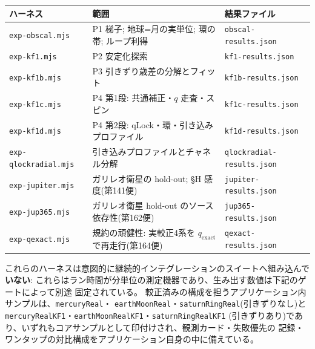 \documentclass[a4paper,10pt,twocolumn]{ltjsarticle}
\begin{document}
\begin{center}
{\footnotesize\setlength{\tabcolsep}{3pt}
\begin{tabularx}{\columnwidth}{@{}YYY@{}}
\toprule
ハーネス & 範囲 & 結果ファイル \\
\midrule
\texttt{exp-\allowbreak obscal.mjs} &
  P1 梯子; 地球=月の実単位; 環の帯; ループ利得 &
  \texttt{obscal-\allowbreak results.json} \\
\texttt{exp-kf1.mjs} & P2 安定化探索 &
  \texttt{kf1-\allowbreak results.json} \\
\texttt{exp-kf1b.mjs} & P3 引きずり歳差の分解とフィット &
  \texttt{kf1b-\allowbreak results.json} \\
\texttt{exp-kf1c.mjs} & P4 第1段: 共通補正・$q$ 走査・スピン &
  \texttt{kf1c-\allowbreak results.json} \\
\texttt{exp-kf1d.mjs} & P4 第2段: qLock・環・引き込みプロファイル &
  \texttt{kf1d-\allowbreak results.json} \\
\texttt{exp-\allowbreak qlockradial.mjs} & 引き込みプロファイルとチャネル分解 &
  \texttt{qlockradial-\allowbreak results.json} \\
\texttt{exp-\allowbreak jupiter.mjs} & ガリレオ衛星の hold-out; \S H 感度(第141便) &
  \texttt{jupiter-\allowbreak results.json} \\
\texttt{exp-\allowbreak jup365.mjs} &
  ガリレオ衛星 hold-out のソース依存性(第162便) &
  \texttt{jup365-\allowbreak results.json} \\
\texttt{exp-\allowbreak qexact.mjs} &
  規約の頑健性: 実較正4系を $q_{\mathrm{exact}}$ で再走行(第164便) &
  \texttt{qexact-\allowbreak results.json} \\
\bottomrule
\end{tabularx}}
\end{center}

これらのハーネスは意図的に継続的インテグレーションのスイートへ組み込んで\textbf{いない}:
これらはラン時間が分単位の測定機器であり、生み出す数値は下記のゲートによって別途
固定されている。
較正済みの構成を担うアプリケーション内サンプルは、\texttt{mercuryReal}・
\texttt{earthMoonReal}・\texttt{saturnRingReal}(引きずりなし)と
\texttt{mercuryRealKF1}・\texttt{earthMoonRealKF1}・\texttt{saturnRingRealKF1}
(引きずりあり)であり、いずれもコアサンプルとして印付けされ、観測カード・失敗優先の
記録・ワンタップの対比構成をアプリケーション自身の中に備えている。
\end{document}
